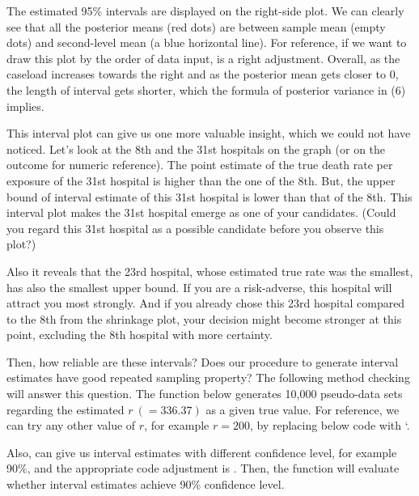\documentclass[article]{jss}
\begin{document}
The estimated 95\% intervals are displayed on the right-side plot. We can clearly see that all the posterior means (red dots) are between sample mean (empty dots) and second-level mean (a blue horizontal line). For reference, if we want to draw this plot by the order of data input,  is a right adjustment. Overall, as the caseload increases towards the right and as the posterior mean gets closer to 0, the length of interval gets shorter, which the formula of posterior variance in (6) implies. 


This interval plot can give us one more valuable insight, which we could not have noticed. Let's look at the 8th and the 31st hospitals on the graph (or on the outcome for numeric reference). The point estimate of the true death rate per exposure of the 31st hospital is higher than the one of the 8th. But, the upper bound of interval estimate of this 31st hospital is lower than that of the 8th. This interval plot makes the 31st hospital emerge as one of your candidates. (Could you regard this 31st hospital as a possible candidate before you observe this plot?)


Also it reveals that the 23rd hospital, whose estimated true rate was the smallest, has also the smallest upper bound. If you are a risk-adverse, this hospital will attract you most strongly. And if you already chose this 23rd hospital compared to the 8th from the shrinkage plot, your decision might become stronger at this point, excluding the 8th hospital with more certainty. 


Then, how reliable are these intervals? Does our procedure to generate interval estimates have good repeated sampling property? The following method checking will answer this question. The  function below generates 10,000 pseudo-data sets regarding the estimated $r~(=336.37)$ as a given true value. For reference, we can try any other value of $r$, for example $r=200$, by replacing below code with `.


Also,  can give us interval estimates with different confidence level, for example 90\%,  and the appropriate code adjustment is .  Then, the function  will evaluate whether interval estimates achieve 90\% confidence level.
\end{document}
